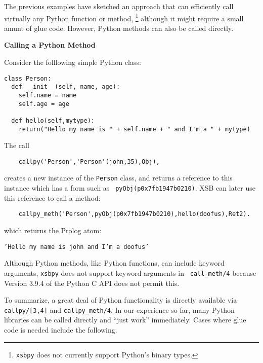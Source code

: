 The previous examples have sketched an approach that can efficiently
call virtually any Python function or method, \footnote{{\tt xsbpy}
  does not currently support Python's binary types.}  although it
might require a small amunt of glue code.  However, Python methods can
also be called directly.

\begin{example} \rm {\bf Calling a Python Method} \label{xsbpy-examp:method}

\noindent
Consider the folllowing simple Python class:

\begin{verbatim}
class Person:
  def __init__(self, name, age):
    self.name = name
    self.age = age

  def hello(self,mytype):
    return("Hello my name is " + self.name + " and I'm a " + mytype)
\end{verbatim}

\noindent
The call

\begin{verbatim}
    callpy('Person','Person'(john,35),Obj),
\end{verbatim}
\noindent
creates a new instance of the {\tt Person} class, and returns a
reference to this instance which has a form such as {\tt
  pyObj(p0x7fb1947b0210)}.  XSB can later use this reference to call a
method:
\begin{verbatim}
    callpy_meth('Person',pyObj(p0x7fb1947b0210),hello(doofus),Ret2).
\end{verbatim}

\noindent
which returns the Prolog atom:

{\tt 'Hello my name is john and I'm a doofus'}

\noindent
Although Python methods, like Python functions, can include keyword
arguments, {\tt xsbpy} does not support keyword arguments in {\tt
  call\_meth/4} because Version 3.9.4 of the Python C API does not
permit this.
\end{example}

To summarize, a great deal of Python functionality is directly
available via {\tt callpy/[3,4]} and {\tt callpy\_meth/4}.  In our
experience so far, many Python libraries can be called directly and
``just work'' immediately.  Cases where glue code is needed include
the following.


